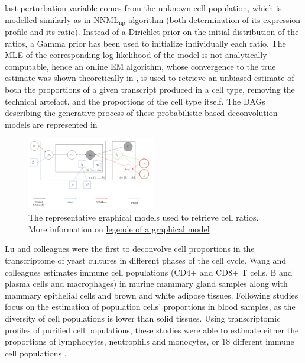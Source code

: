 last perturbation variable comes from the unknown cell population, which
is modelled similarly as in \(\text{NNML}_\text{np}\) algorithm (both
determination of its expression profile and its ratio). Instead of a
Dirichlet prior on the initial distribution of the ratios, a Gamma prior
has been used to initialize individually each ratio. The MLE of the
corresponding log-likelihood of the model is not analytically
computable, hence an online EM algorithm, whose convergence to the true
estimate was shown theoretically in
\autocite{dempster_etal77}, is used to retrieve an unbiased estimate of both the proportions
of a given transcript produced in a cell type, removing the technical
artefact, and the proportions of the cell type itself.
The DAGs describing the generative process of these probabilistic-based deconvolution models are represented in 

\begin{figure}
\centering
\includegraphics[width=0.5\textwidth]{figures/directed_probalistic_model.png}
\caption{The representative graphical models used to retrieve cell
ratios. More information on
\href{https://revbayes.github.io/tutorials/intro/graph_models.html\#legend}{legende
of a graphical model}}
\label{fig:probalistic-model}
\end{figure}

Lu and colleagues\autocite{lu_etal03} were the first to deconvolve cell proportions in the
transcriptome of yeast cultures in different phases of the cell cycle.
Wang and colleagues estimates immune cell populations (CD4+ and CD8+ T
cells, B and plasma cells and macrophages) in murine mammary gland
samples along with mammary epithelial cells and brown and white adipose
tissues. Following studies focus on the estimation of population cells'
proportions in blood samples, as the diversity of cell populations is
lower than solid tissues. Using transcriptomic profiles of purified cell
populations, these studies were able to estimate either the proportions
of lymphocytes, neutrophils and
monocytes\autocite{gong_etal11}, or 18
different immune cell populations \autocite{abbas_etal09}.


